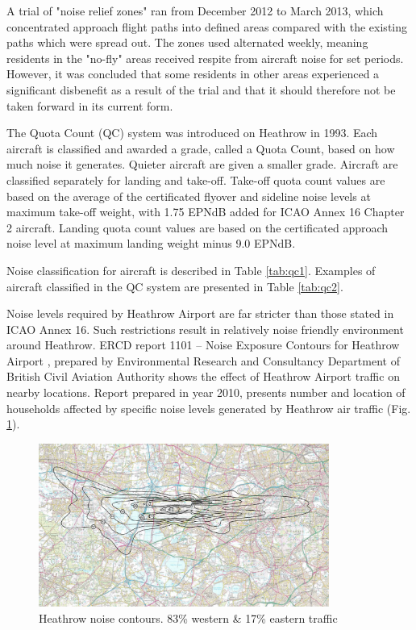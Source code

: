 A trial of "noise relief zones" ran from December 2012 to March 2013, which concentrated approach flight paths into defined areas compared with the existing paths which were spread out. The zones used alternated weekly, meaning residents in the "no-fly" areas received respite from aircraft noise for set periods. However, it was concluded that some residents in other areas experienced a significant disbenefit as a result of the trial and that it should therefore not be taken forward in its current form.

The Quota Count (QC) system was introduced on Heathrow in 1993. Each aircraft is classified and awarded a grade, called a Quota Count, based on how much noise it generates. Quieter aircraft are given a smaller grade.  Aircraft are classified separately for landing and take-off. Take-off quota count values are based on the average of the certificated flyover and sideline noise levels at maximum take-off weight, with 1.75 EPNdB added for ICAO Annex 16 Chapter 2 aircraft. Landing quota count values are based on the certificated approach noise level at maximum landing weight minus 9.0 EPNdB.

Noise classification for aircraft is described in Table \ref{tab:qc1}. Examples of aircraft classified in the QC system are presented in Table \ref{tab:qc2}.

Noise levels required by Heathrow Airport are far stricter than those stated in ICAO Annex 16. Such restrictions result in relatively noise friendly environment around Heathrow. ERCD report 1101 – Noise Exposure Contours for Heathrow Airport \citep{ERCD}, prepared by Environmental Research and Consultancy Department of British Civil Aviation Authority shows the effect of Heathrow Airport traffic on nearby locations. Report prepared in year 2010, presents number and location of households affected by specific noise levels generated by Heathrow air traffic (Fig. \ref{heathrow}).

\begin{figure}[h!]
\centering %
\includegraphics[width=0.85\textwidth]{Pictures/heathrow.png}
\caption{Heathrow noise contours. 83\% western \& 17\% eastern traffic \citep{ERCD}}
\label{heathrow}
\end{figure}

